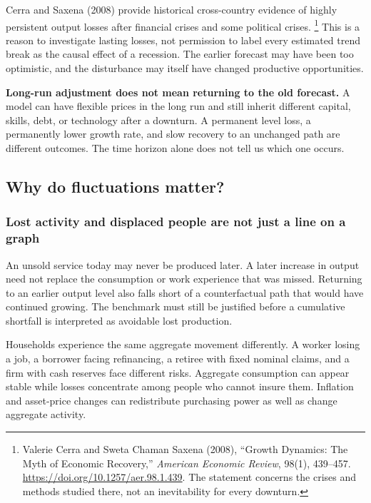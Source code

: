 Cerra and Saxena (2008) provide historical cross-country evidence of highly
persistent output losses after financial crises and some political crises.
\footnote{Valerie Cerra and Sweta Chaman Saxena (2008), ``Growth Dynamics:
The Myth of Economic Recovery,'' \textit{American Economic Review}, 98(1),
439--457. \url{https://doi.org/10.1257/aer.98.1.439}. The statement concerns
the crises and methods studied there, not an inevitability for every downturn.}
This is a reason to investigate lasting losses, not permission to label every
estimated trend break as the causal effect of a recession. The earlier
forecast may have been too optimistic, and the disturbance may itself have
changed productive opportunities.

\begin{blueblock}
\textbf{Long-run adjustment does not mean returning to the old forecast.}
A model can have flexible prices in the long run and still inherit different
capital, skills, debt, or technology after a downturn. A permanent level loss,
a permanently lower growth rate, and slow recovery to an unchanged path are
different outcomes. The time horizon alone does not tell us which one occurs.
\end{blueblock}

\subsection{Why do fluctuations matter?}

\subsubsection{Lost activity and displaced people are not just a line on a graph}

An unsold service today may never be produced later. A later increase in
output need not replace the consumption or work experience that was missed.
Returning to an earlier output level also falls short of a counterfactual
path that would have continued growing. The benchmark must still be justified
before a cumulative shortfall is interpreted as avoidable lost production.

Households experience the same aggregate movement differently. A worker
losing a job, a borrower facing refinancing, a retiree with fixed nominal
claims, and a firm with cash reserves face different risks. Aggregate
consumption can appear stable while losses concentrate among people who
cannot insure them. Inflation and asset-price changes can redistribute
purchasing power as well as change aggregate activity.

